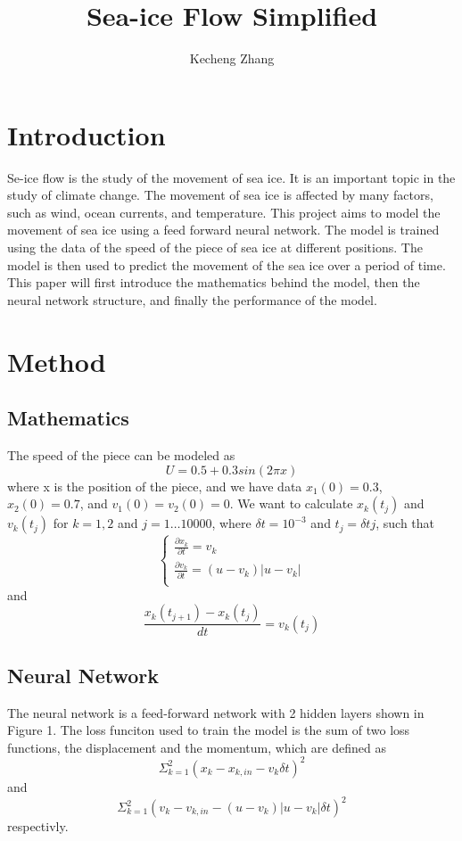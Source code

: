 \documentclass[12pt, a4paper]{article}
\begin{document}
\title{Sea-ice Flow Simplified}
\author{Kecheng Zhang}
\maketitle


\section{Introduction}
Se-ice flow is the study of the movement of sea ice. It is an important topic in the study of climate change. The movement of sea ice is affected by many factors, such as wind, ocean currents, and temperature.
This project aims to model the movement of sea ice using a feed forward neural network. The model is trained using the data of the speed of the piece of sea ice at different positions. The model is then used to predict the movement of the sea ice over a period of time.
This paper will first introduce the mathematics behind the model, then the neural network structure, and finally the performance of the model.
\section{Method}

\subsection{Mathematics}
The speed of the piece can be modeled as
$$ U = 0.5 + 0.3sin(2 \pi x) $$
where x is the position of the piece, and we have data
$x_1(0) = 0.3$, $x_2(0) = 0.7$, and $v_1(0) = v_2(0) = 0$.
We want to calculate
$x_k(t_j)$ and $v_k(t_j)$ for $k = 1, 2$ and $j = 1\dots10000$, where
$\delta t = 10^{-3}$ and $t_j = \delta t j$, such that
$$\begin{cases}
    \frac{\partial x_k}{\partial t} = v_k\\
    \frac{\partial v_k}{\partial t} = (u - v_k) |u - v_k|\\
    \end{cases}$$
and $$ \frac{x_k(t_{j+1}) - x_k(t_j)}{dt} = v_k(t_j)$$

\subsection{Neural Network}
The neural network is a feed-forward network with 2 hidden layers shown in Figure 1. The loss funciton used to train the model is the sum of two loss functions, the displacement and the momentum, which are defined as $$\Sigma^2_{k=1}(x_k - x_{k,in} - v_k\delta t)^2$$ and $$\Sigma^2_{k=1}(v_k - v_{k,in} - (u - v_k) |u - v_k|\delta t)^2$$ respectivly.
\end{document}
